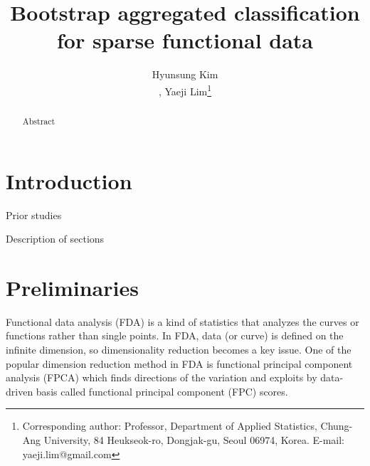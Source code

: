 \documentclass[eng]{csam}
\begin{document}
\title{Bootstrap aggregated classification for sparse functional data}

\author{Hyunsung Kim\address[a]{Department of Statistics, Chung-Ang University, Korea}, 
	Yaeji Lim\footnote{Corresponding author: Professor, Department of Applied Statistics, Chung-Ang University, 84 Heukseok-ro, Dongjak-gu, Seoul 06974, Korea. E-mail: yaeji.lim@gmail.com}\address[b]{Department of Applied Statistics, Chung-Ang University, Korea}}

\begin{abstract}
	{\color{red}
		Abstract
	}
\end{abstract}


\section{Introduction}
{\color{red} 
	Prior studies
	
	Description of sections
}


\section{Preliminaries}
Functional data analysis (FDA) is a kind of statistics that analyzes the curves or functions rather than single points. In FDA, data (or curve) is defined on the infinite dimension, so dimensionality reduction becomes a key issue. One of the popular dimension reduction method in FDA is functional principal component analysis (FPCA) which finds directions of the variation and exploits by data-driven basis called functional principal component (FPC) scores. 
\end{document}
